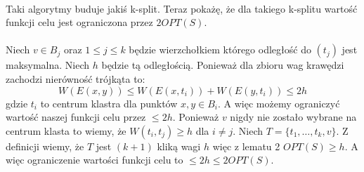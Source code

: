 \\
Taki algorytmy buduje jakiś k-split.
Teraz pokażę, że dla takiego k-splitu wartość funkcji celu jest ograniczona przez $2OPT(S)$.
\\~\\
Niech $v \in B_{j}$ oraz $1 \leq j \leq k$ będzie wierzchołkiem którego odległość do $(t_{j})$ jest maksymalna.
Niech $h$ będzie tą odległością.
Ponieważ dla zbioru wag krawędzi zachodzi nierówność trójkąta to:
\begin{equation}
    W(E(x, y)) \leq W(E(x, t_{i})) + W(E(y, t_{i})) \leq 2h
\end{equation}
gdzie $t_{i}$ to centrum klastra dla punktów $x, y \in B_{i}$.
A więc możemy ograniczyć wartość naszej funkcji celu przez $\leq 2h$.
Ponieważ $v$ nigdy nie zostało wybrane na centrum klasta to wiemy, że $W(t_{i}, t_{j}) \geq h$ dla $i \neq j$.
Niech $T = \{ t_{1}, \dots, t_{k}, v \}$.
Z definicji wiemy, że $T$ jest $(k+1)$ kliką wagi $h$ więc z lematu 2 $OPT(S) \geq h$.
A więc ograniczenie wartości funkcji celu to $\leq 2h \leq 2OPT(S)$.
      

